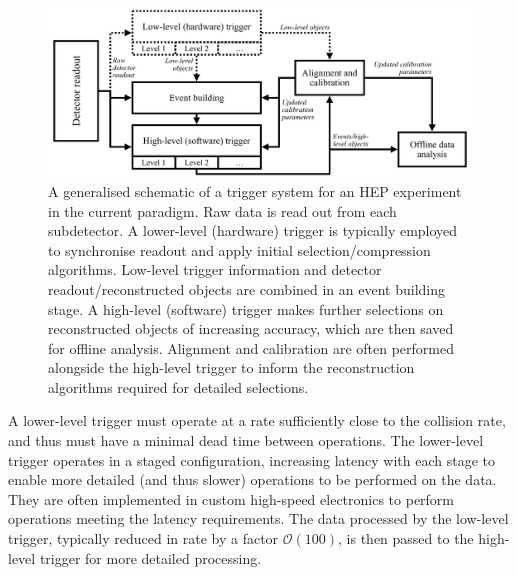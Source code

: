 \begin{figure}[h!]
    \centering
    \includegraphics[width=\linewidth]{images/trigger_schematic.pdf}
    \caption[A sketch of a trigger system for a  HEP experiment in the current paradigm. Raw data is read out from each subdetector. A low-level (hardware) trigger is typically employed to synchronise readout and apply initial selection/compression algorithms. A high-level (software) trigger makes further selections on reconstructed objects of increasing accuracy, which are then saved for offline analysis. Alignment and calibration are often performed alongside the high-level trigger to inform the reconstruction algorithms required for detailed selections.]{A generalised schematic of a trigger system for an HEP experiment in the current paradigm. Raw data is read out from each subdetector. A lower-level (hardware) trigger is typically employed to synchronise readout and apply initial selection/compression algorithms. Low-level trigger information and detector readout/reconstructed objects are combined in an event building stage. A high-level (software) trigger makes further selections on reconstructed objects of increasing accuracy, which are then saved for offline analysis. Alignment and calibration are often performed alongside the high-level trigger to inform the reconstruction algorithms required for detailed selections.}
    \label{trigger-schema}
\end{figure}


A lower-level trigger must operate at a rate sufficiently close to the collision rate, and thus must have a minimal dead time between operations. 
The lower-level trigger operates in a staged configuration, increasing latency with each stage to enable more detailed (and thus slower) operations to be performed on the data. 
They are often implemented in custom high-speed electronics to perform operations meeting the latency requirements. 
The data processed by the low-level trigger, typically reduced in rate by a factor $\mathcal{O}\left(100\right)$, is then passed to the high-level trigger for more detailed processing.

